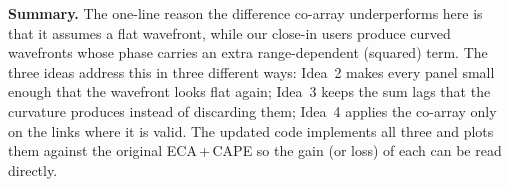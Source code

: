 \documentclass[10pt]{article}
\begin{document}
\textbf{Summary.} The one-line reason the difference co-array underperforms here is that it assumes a
flat wavefront, while our close-in users produce curved wavefronts whose phase carries an extra
range-dependent (squared) term. The three ideas address this in three different ways: Idea~2 makes
every panel small enough that the wavefront looks flat again; Idea~3 keeps the sum lags that the
curvature produces instead of discarding them; Idea~4 applies the co-array only on the links where it
is valid. The updated code implements all three and plots them against the original ECA\,+\,CAPE so
the gain (or loss) of each can be read directly.
\end{document}
